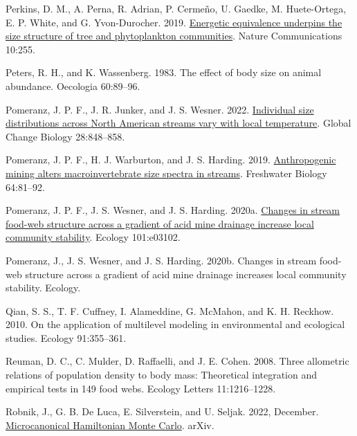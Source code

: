 \documentclass[
  12pt,
]{article}
\newlength{\cslhangindent}
\newlength{\cslentryspacingunit} %
\newenvironment{CSLReferences}[2] %
 {%
  \setlength{\parindent}{0pt}
  \ifodd #1
  \let\oldpar\par
  \def\par{\hangindent=\cslhangindent\oldpar}
  \fi
  \setlength{\parskip}{#2\cslentryspacingunit}
 }%
 {}
\numberwithin{equation}
\begin{document}
\begin{CSLReferences}{1}{0}
\leavevmode{}%
Perkins, D. M., A. Perna, R. Adrian, P. Cermeño, U. Gaedke, M.
Huete-Ortega, E. P. White, and G. Yvon-Durocher. 2019.
\href{https://doi.org/10.1038/s41467-018-08039-3}{Energetic equivalence
underpins the size structure of tree and phytoplankton communities}.
Nature Communications 10:255.

\leavevmode{}%
Peters, R. H., and K. Wassenberg. 1983. The effect of body size on
animal abundance. Oecologia 60:89--96.

\leavevmode{}%
Pomeranz, J. P. F., J. R. Junker, and J. S. Wesner. 2022.
\href{https://doi.org/10.1111/gcb.15862}{Individual size distributions
across {North American} streams vary with local temperature}. Global
Change Biology 28:848--858.

\leavevmode{}%
Pomeranz, J. P. F., H. J. Warburton, and J. S. Harding. 2019.
\href{https://doi.org/10.1111/fwb.13196}{Anthropogenic mining alters
macroinvertebrate size spectra in streams}. Freshwater Biology
64:81--92.

\leavevmode{}%
Pomeranz, J. P. F., J. S. Wesner, and J. S. Harding. 2020a.
\href{https://doi.org/10.1002/ecy.3102}{Changes in stream food-web
structure across a gradient of acid mine drainage increase local
community stability}. Ecology 101:e03102.

\leavevmode{}%
Pomeranz, J., J. S. Wesner, and J. S. Harding. 2020b. Changes in stream
food-web structure across a gradient of acid mine drainage increases
local community stability. Ecology.

\leavevmode{}%
Qian, S. S., T. F. Cuffney, I. Alameddine, G. McMahon, and K. H.
Reckhow. 2010. On the application of multilevel modeling in
environmental and ecological studies. Ecology 91:355--361.

\leavevmode{}%
Reuman, D. C., C. Mulder, D. Raffaelli, and J. E. Cohen. 2008. Three
allometric relations of population density to body mass: Theoretical
integration and empirical tests in 149 food webs. Ecology Letters
11:1216--1228.

\leavevmode{}%
Robnik, J., G. B. De Luca, E. Silverstein, and U. Seljak. 2022,
December.
\href{https://doi.org/10.48550/arXiv.2212.08549}{Microcanonical
{Hamiltonian Monte Carlo}}. {arXiv}.


\end{CSLReferences}
\end{document}
